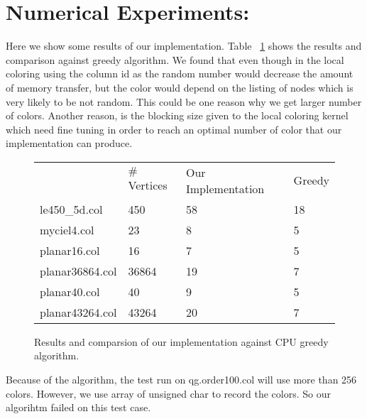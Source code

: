 \documentclass[12pt] {article}
\begin{document}

\section*{Numerical Experiments:}
Here we show some results of our implementation. Table ~\ref{tab:results} shows the results and comparison against greedy algorithm. We found that even though in the local coloring using the column id as the random number would decrease the amount of memory transfer, but the color would depend on the listing of nodes which is very likely to be not random. This could be one reason why we get larger number of colors. Another reason, is the blocking size given to the local coloring kernel which need fine tuning in order to reach an optimal number of color that our implementation can produce. 


\begin{figure}[tbh]
 \centering    
\begin{tabular}{ |p{4cm}||p{3cm}|| p{4cm}|p{4cm}|}
 \hline
   & $\#$Vertices & Our Implementation &  Greedy \\ 
     
     \hhline{|=||=||=|=|}
 \hline
 le450\_5d.col &450       & 58  &18 \\
 \hline
 myciel4.col &  23       & 8  &5 \\
 \hline
  planar16.col &16        & 7  &5 \\
 \hline
  planar36864.col & 36864     & 19  &7 \\
 \hline
   planar40.col &  40      & 9  & 5\\
 \hline
   planar43264.col & 43264     &  20 & 7\\
 \hline
 
 
\end{tabular} 
\caption{Results and comparsion of our implementation against CPU greedy algorithm.}
   \label{tab:results}
\end{figure} 

Because of the algorithm, the test run on qg.order100.col will use more than 256 colors. However, we use array of unsigned char to record the colors. So our algorihtm failed on this test case.
\end{document}
